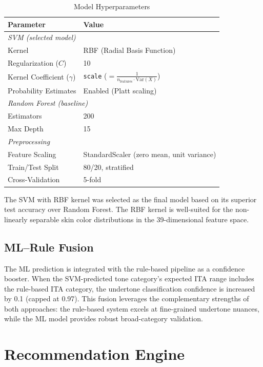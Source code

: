 \documentclass[conference]{IEEEtran}
\begin{document}
\begin{table}[t]
\centering
\caption{Model Hyperparameters}
\label{tab:hyperparams}
\begin{tabular}{ll}
\toprule
\textbf{Parameter} & \textbf{Value} \\
\midrule
\multicolumn{2}{l}{\textit{SVM (selected model)}} \\
\quad Kernel & RBF (Radial Basis Function) \\
\quad Regularization ($C$) & 10 \\
\quad Kernel Coefficient ($\gamma$) & \texttt{scale} ($= \frac{1}{n_{\text{features}} \cdot \text{Var}(X)}$) \\
\quad Probability Estimates & Enabled (Platt scaling) \\
\midrule
\multicolumn{2}{l}{\textit{Random Forest (baseline)}} \\
\quad Estimators & 200 \\
\quad Max Depth & 15 \\
\midrule
\multicolumn{2}{l}{\textit{Preprocessing}} \\
\quad Feature Scaling & StandardScaler (zero mean, unit variance) \\
\quad Train/Test Split & 80/20, stratified \\
\quad Cross-Validation & 5-fold \\
\bottomrule
\end{tabular}
\end{table}

The SVM with RBF kernel was selected as the final model based on its superior test accuracy over Random Forest. The RBF kernel is well-suited for the non-linearly separable skin color distributions in the 39-dimensional feature space.

\subsection{ML--Rule Fusion}

The ML prediction is integrated with the rule-based pipeline as a confidence booster. When the SVM-predicted tone category's expected ITA range includes the rule-based ITA category, the undertone classification confidence is increased by 0.1 (capped at 0.97). This fusion leverages the complementary strengths of both approaches: the rule-based system excels at fine-grained undertone nuances, while the ML model provides robust broad-category validation.

\section{Recommendation Engine}
\end{document}
